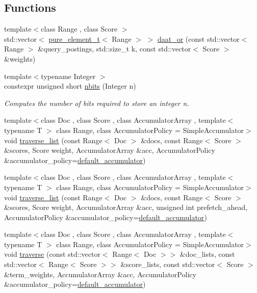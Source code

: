 \subsection*{Functions}
\begin{DoxyCompactItemize}
\item 
{\footnotesize template$<$class Range , class Score $>$ }\\std\+::vector$<$ \hyperlink{namespaceirkit_afcffab67300c5c703cb38a363c9a6f1d}{pure\+\_\+element\+\_\+t}$<$ Range $>$ $>$ \hyperlink{namespaceirkit_ad6a1763616725ecb88e751ea7eb93453}{daat\+\_\+or} (const std\+::vector$<$ Range $>$ \&query\+\_\+postings, std\+::size\+\_\+t k, const std\+::vector$<$ Score $>$ \&weights)
\item 
{\footnotesize template$<$typename Integer $>$ }\\constexpr unsigned short \hyperlink{namespaceirkit_a11ecd56a4192fe476a58f84d54733a85}{nbits} (Integer n)
\begin{DoxyCompactList}\small\item\em Computes the number of bits required to store an integer n. \end{DoxyCompactList}\item 
{\footnotesize template$<$class Doc , class Score , class Accumulator\+Array , template$<$ typename T $>$ class Range, class Accumulator\+Policy  = Simple\+Accumulator$>$ }\\void \hyperlink{namespaceirkit_ac5cd7f5c083918572c6b91cd9822768d}{traverse\+\_\+list} (const Range$<$ Doc $>$ \&docs, const Range$<$ Score $>$ \&scores, Score weight, Accumulator\+Array \&acc, Accumulator\+Policy \&accumulator\+\_\+policy=\hyperlink{namespaceirkit_a823671564bf545991e9708011e4a8df1}{default\+\_\+accumulator})
\item 
{\footnotesize template$<$class Doc , class Score , class Accumulator\+Array , template$<$ typename T $>$ class Range, class Accumulator\+Policy  = Simple\+Accumulator$>$ }\\void \hyperlink{namespaceirkit_a80010d3825abc594bcd8fcc8225804d2}{traverse\+\_\+list} (const Range$<$ Doc $>$ \&docs, const Range$<$ Score $>$ \&scores, Score weight, Accumulator\+Array \&acc, unsigned int prefetch\+\_\+ahead, Accumulator\+Policy \&accumulator\+\_\+policy=\hyperlink{namespaceirkit_a823671564bf545991e9708011e4a8df1}{default\+\_\+accumulator})
\item 
{\footnotesize template$<$class Doc , class Score , class Accumulator\+Array , template$<$ typename T $>$ class Range, class Accumulator\+Policy  = Simple\+Accumulator$>$ }\\void \hyperlink{namespaceirkit_a887e759137d1d5327475cb75039bb5ec}{traverse} (const std\+::vector$<$ Range$<$ Doc $>$$>$ \&doc\+\_\+lists, const std\+::vector$<$ Range$<$ Score $>$$>$ \&score\+\_\+lists, const std\+::vector$<$ Score $>$ \&term\+\_\+weights, Accumulator\+Array \&acc, Accumulator\+Policy \&accumulator\+\_\+policy=\hyperlink{namespaceirkit_a823671564bf545991e9708011e4a8df1}{default\+\_\+accumulator})

\end{DoxyCompactItemize}
